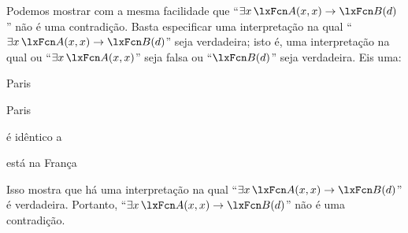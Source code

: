 Podemos mostrar com a mesma facilidade que \textquotedblleft $\exists x\,\atom{A}{x,x} \eif \atom{B}{d}$\textquotedblright{} não é uma contradição. Basta especificar uma interpretação na qual \textquotedblleft $\exists x\,\atom{A}{x,x} \eif \atom{B}{d}$\textquotedblright{} seja verdadeira; isto é, uma interpretação na qual ou \textquotedblleft $\exists x\, \atom{A}{x,x}$\textquotedblright{} seja falsa ou \textquotedblleft $\atom{B}{d}$\textquotedblright{} seja verdadeira. Eis uma:
	\begin{ekey}
\item[\text{domínio}] Paris
		\item[d] Paris
\item[\atom{A}{x,y}]  é idêntico a 
\item[\atom{B}{x}]  está na França
	\end{ekey}
Isso mostra que há uma interpretação na qual \textquotedblleft $\exists x\,\atom{A}{x,x} \eif \atom{B}{d}$\textquotedblright{} é verdadeira. Portanto, \textquotedblleft $\exists x\, \atom{A}{x,x} \eif \atom{B}{d}$\textquotedblright{} não é uma contradição.

